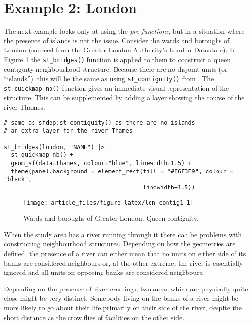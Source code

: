 \hypertarget{example-2-london}{%
\section{Example 2: London}\label{example-2-london}}

The next example looks only at using the \emph{pre-functions}, but in a situation where the presence of islands is not the issue. Consider the wards and boroughs of London (sourced from the Greater London Authority's \href{https://data.london.gov.uk/}{London Datastore}). In Figure \ref{fig:lon-contig1} the \texttt{st\_bridges()}
function is applied to them to construct a queen contiguity
neighbourhood structure. Because there are no disjoint units (or
``islands''), this will be the same as using \texttt{st\_contiguity()} from
. The \texttt{st\_quickmap\_nb()} function gives an immediate
visual representation of the structure. This can be supplemented by
adding a layer showing the course of the river Thames.

\begin{verbatim}
# same as sfdep:st_contiguity() as there are no islands
# an extra layer for the river Thames

st_bridges(london, "NAME") |> 
  st_quickmap_nb() + 
  geom_sf(data=thames, colour="blue", linewidth=1.5) + 
  theme(panel.background = element_rect(fill = "#F6F3E9", colour = "black", 
                                        linewidth=1.5))
\end{verbatim}

\begin{figure}

{\centering \texttt{[image: article\_files/figure-latex/lon-contig1-1]} 

}

\caption{Wards and boroughs of Greater London. Queen contiguity. }\label{fig:lon-contig1}
\end{figure}

When the study area has a river running through it there can be problems
with constructing neighbourhood structures. Depending on how the
geometries are defined, the presence of a river can either mean that no
units on either side of its banks are considered neighbours or, at the
other extreme, the river is essentially ignored and all units on
opposing banks are considered neighbours.

Depending on the presence of river crossings, two areas which are
physically quite close might be very distinct. Somebody living on the
banks of a river might be more likely to go about their life primarily
on their side of the river, despite the short distance as the crow flies
of facilities on the other side.

